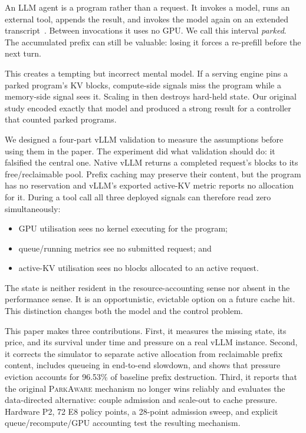 \documentclass[sigconf,nonacm]{acmart}
\newcommand{\sys}{\textsc{ParkAware}\xspace}
\begin{document}
An LLM agent is a program rather than a request. It invokes a model, runs an
external tool, appends the result, and invokes the model again on an extended
transcript~\cite{react}. Between invocations it uses no GPU. We call this
interval \emph{parked}. The accumulated prefix can still be valuable: losing
it forces a re-prefill before the next turn.

This creates a tempting but incorrect mental model. If a serving engine pins a
parked program's KV blocks, compute-side signals miss the program while a
memory-side signal sees it. Scaling in then destroys hard-held state. Our
original study encoded exactly that model and produced a strong result for a
controller that counted parked programs.

We designed a four-part vLLM validation to measure the assumptions before
using them in the paper. The experiment did what validation should do: it
falsified the central one. Native vLLM returns a completed request's blocks to
its free/reclaimable pool. Prefix caching may preserve their content, but the
program has no reservation and vLLM's exported active-KV metric reports no
allocation for it. During a tool call all three deployed signals can therefore
read zero simultaneously:

\begin{itemize}
\item GPU utilisation sees no kernel executing for the program;
\item queue/running metrics see no submitted request; and
\item active-KV utilisation sees no blocks allocated to an active request.
\end{itemize}

The state is neither resident in the resource-accounting sense nor absent in
the performance sense. It is an opportunistic, evictable option on a future
cache hit. This distinction changes both the model and the control problem.

This paper makes three contributions. First, it measures the missing state,
its price, and its survival under time and pressure on a real vLLM instance.
Second, it corrects the simulator to separate active allocation from
reclaimable prefix content, includes queueing in end-to-end slowdown, and shows
that pressure eviction accounts for 96.53\% of baseline prefix destruction.
Third, it reports that the original \sys mechanism no longer wins reliably and
evaluates the data-directed alternative: couple admission and scale-out to
cache pressure. Hardware P2, 72 E8 policy points, a 28-point admission sweep,
and explicit queue/recompute/GPU accounting test the resulting mechanism.
\end{document}
